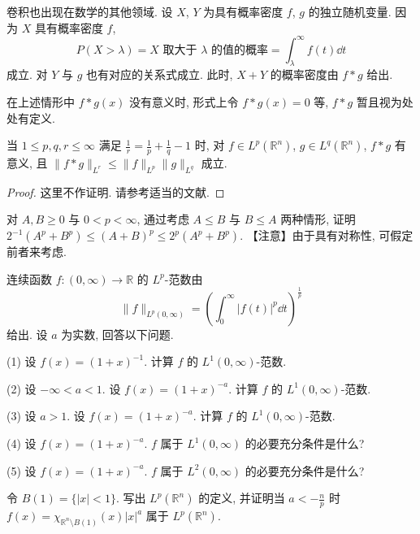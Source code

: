 卷积也出现在数学的其他领域. 设 $X$, $Y$ 为具有概率密度 $f$, $g$ 的独立随机变量. 因为 $X$ 具有概率密度 $f$,
\[
P(X > \lambda) = X \text{ 取大于 } \lambda \text{ 的值的概率} = \int_{\lambda}^{\infty}f(t)\dd t
\]
成立. 对 $Y$ 与 $g$ 也有对应的关系式成立. 此时, $X + Y$ 的概率密度由 $f * g$ 给出.

在上述情形中 $f * g(x)$ 没有意义时, 形式上令 $f * g(x) = 0$ 等, $f * g$ 暂且视为处处有定义.

\begin{theorem}\label{thm:2.20}
当 $1 \leq p, q, r \leq \infty$ 满足 $\frac{1}{r} = \frac{1}{p} + \frac{1}{q} - 1$ 时, 对 $f \in L^{p}(\mathbb{R}^{n})$, $g \in L^{q}(\mathbb{R}^{n})$, $f * g$ 有意义, 且 $\|f * g\|_{L^{r}} \leq \|f\|_{L^{p}}\|g\|_{L^{q}}$ 成立.
\end{theorem}

\begin{proof}
这里不作证明. 请参考适当的文献.
\end{proof}

\begin{exercise}\label{exer:2.1}
对 $A, B \geq 0$ 与 $0 < p < \infty$, 通过考虑 $A \leq B$ 与 $B \leq A$ 两种情形, 证明 $2^{-1}(A^{p} + B^{p}) \leq (A + B)^{p} \leq 2^{p}(A^{p} + B^{p})$. 【注意】由于具有对称性, 可假定前者来考虑.
\end{exercise}

\begin{exercise}\label{exer:2.2}
连续函数 $f: (0, \infty) \to \mathbb{R}$ 的 $L^{p}$-范数由
\[
\|f\|_{L^{p}(0, \infty)} = \left(\int_{0}^{\infty}|f(t)|^{p}\dd t\right)^{\frac{1}{p}}
\]
给出. 设 $a$ 为实数, 回答以下问题.

(1) 设 $f(x) = (1 + x)^{-1}$. 计算 $f$ 的 $L^{1}(0, \infty)$-范数.

(2) 设 $-\infty < a < 1$. 设 $f(x) = (1 + x)^{-a}$. 计算 $f$ 的 $L^{1}(0, \infty)$-范数.

(3) 设 $a > 1$. 设 $f(x) = (1 + x)^{-a}$. 计算 $f$ 的 $L^{1}(0, \infty)$-范数.

(4) 设 $f(x) = (1 + x)^{-a}$. $f$ 属于 $L^{1}(0, \infty)$ 的必要充分条件是什么?

(5) 设 $f(x) = (1 + x)^{-a}$. $f$ 属于 $L^{2}(0, \infty)$ 的必要充分条件是什么?
\end{exercise}

\begin{exercise}\label{exer:2.3}
令 $B(1) = \{|x| < 1\}$. 写出 $L^{p}(\mathbb{R}^{n})$ 的定义, 并证明当 $a < -\frac{n}{p}$ 时 $f(x) = \chi_{\mathbb{R}^{n}\setminus B(1)}(x)|x|^{a}$ 属于 $L^{p}(\mathbb{R}^{n})$.
\end{exercise}
